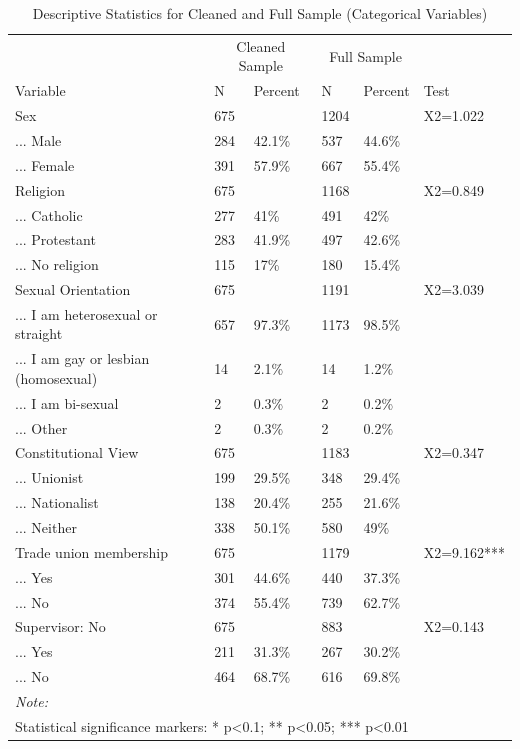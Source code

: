 \documentclass[
]{article}
\begin{document}
\begin{table}[H]

\caption{\label{tab:unnamed-chunk-1}Descriptive Statistics for Cleaned and Full Sample (Categorical Variables)}
\centering
\begin{tabular}[t]{llllll}
\toprule
\multicolumn{1}{c}{ } & \multicolumn{2}{c}{Cleaned Sample} & \multicolumn{2}{c}{Full Sample} & \multicolumn{1}{c}{ } \\
\cmidrule(l{3pt}r{3pt}){2-3} \cmidrule(l{3pt}r{3pt}){4-5}
Variable & N & Percent & N & Percent & Test\\
\midrule
Sex & 675 &  & 1204 &  & X2=1.022\\
... Male & 284 & 42.1\% & 537 & 44.6\% & \\
... Female & 391 & 57.9\% & 667 & 55.4\% & \\
Religion & 675 &  & 1168 &  & X2=0.849\\
... Catholic & 277 & 41\% & 491 & 42\% & \\
\addlinespace
... Protestant & 283 & 41.9\% & 497 & 42.6\% & \\
... No religion & 115 & 17\% & 180 & 15.4\% & \\
Sexual Orientation & 675 &  & 1191 &  & X2=3.039\\
... I am heterosexual or straight & 657 & 97.3\% & 1173 & 98.5\% & \\
... I am gay or lesbian (homosexual) & 14 & 2.1\% & 14 & 1.2\% & \\
\addlinespace
... I am bi-sexual & 2 & 0.3\% & 2 & 0.2\% & \\
... Other & 2 & 0.3\% & 2 & 0.2\% & \\
Constitutional View & 675 &  & 1183 &  & X2=0.347\\
... Unionist & 199 & 29.5\% & 348 & 29.4\% & \\
... Nationalist & 138 & 20.4\% & 255 & 21.6\% & \\
\addlinespace
... Neither & 338 & 50.1\% & 580 & 49\% & \\
Trade union membership & 675 &  & 1179 &  & X2=9.162***\\
... Yes & 301 & 44.6\% & 440 & 37.3\% & \\
... No & 374 & 55.4\% & 739 & 62.7\% & \\
Supervisor: No & 675 &  & 883 &  & X2=0.143\\
\addlinespace
... Yes & 211 & 31.3\% & 267 & 30.2\% & \\
... No & 464 & 68.7\% & 616 & 69.8\% & \\
\bottomrule
\multicolumn{6}{l}{\rule{0pt}{1em}\textit{Note: }}\\
\multicolumn{6}{l}{\rule{0pt}{1em}Statistical significance markers: * p<0.1; ** p<0.05; *** p<0.01}\\
\end{tabular}
\end{table}
\end{document}
